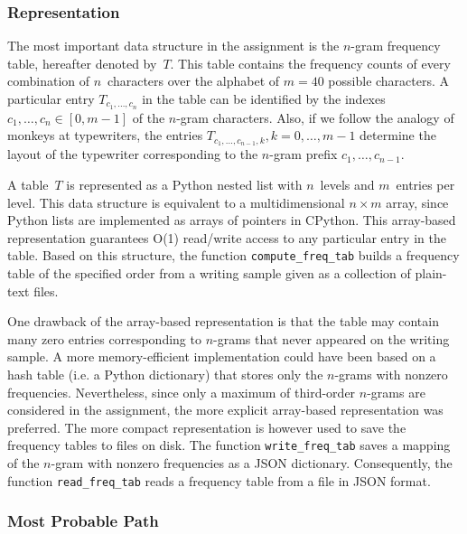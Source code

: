 \documentclass[conference]{IEEEtran}
\newcommand{\codeinline}[1]{{\fontsize{8}{0}\selectfont\texttt{#1}}}
\begin{document}
\vspace{0.5em}
\subsubsection{Representation}

The most important data structure in the assignment is the $n$-gram frequency table, hereafter denoted by~$T$.
This table contains the frequency counts of every combination of $n$~characters over the alphabet of $m=40$ possible characters.
A particular entry $T_{c_1,\ldots,c_n}$ in the table can be identified by the indexes $c_1,\ldots,c_n \in [0,m-1]$ of the $n$-gram characters.
Also, if we follow the analogy of monkeys at typewriters, the entries $T_{c_1,\ldots,c_{n-1},k}, k=0,\ldots,m-1$ determine the layout of the typewriter corresponding to the $n$-gram prefix $c_1,\ldots,c_{n-1}$.

A table~$T$ is represented as a Python nested list with $n$~levels and $m$~entries per level.
This data structure is equivalent to a multidimensional $n \times m$ array, since Python lists are implemented as arrays of pointers in CPython.
This array-based representation guarantees O(1) read/write access to any particular entry in the table.
Based on this structure, the function \codeinline{compute\_freq\_tab} builds a frequency table of the specified order from a writing sample given as a collection of plain-text files.

One drawback of the array-based representation is that the table may contain many zero entries corresponding to $n$-grams that never appeared on the writing sample.
A more memory-efficient implementation could have been based on a hash table (i.e. a Python dictionary) that stores only the $n$-grams with nonzero frequencies.
Nevertheless, since only a maximum of third-order $n$-grams are considered in the assignment, the more explicit array-based representation was preferred.
The more compact representation is however used to save the frequency tables to files on disk.
The function \codeinline{write\_freq\_tab} saves a mapping of the $n$-gram with nonzero frequencies as a JSON dictionary.
Consequently, the function \codeinline{read\_freq\_tab} reads a frequency table from a file in JSON format.


\vspace{0.5em}
\subsubsection{Most Probable Path}
\end{document}
